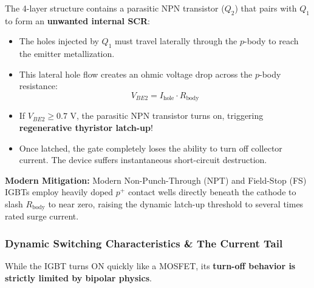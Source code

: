 \documentclass[11pt,a4paper]{article}
\begin{document}
\begin{alertbox}
The 4-layer structure contains a parasitic NPN transistor ($Q_2$) that pairs with $Q_1$ to form an \textbf{unwanted internal SCR}:
\begin{itemize}
  \item The holes injected by $Q_1$ must travel laterally through the $p$-body to reach the emitter metallization.
  \item This lateral hole flow creates an ohmic voltage drop across the $p$-body resistance:
  \begin{equation}
  V_{BE2} = I_{\text{hole}} \cdot R_{\text{body}}
  \end{equation}
  \item If $V_{BE2} \ge 0.7\text{ V}$, the parasitic NPN transistor turns on, triggering \textbf{regenerative thyristor latch-up}!
  \item Once latched, the gate completely loses the ability to turn off collector current. The device suffers instantaneous short-circuit destruction.
\end{itemize}
\textbf{Modern Mitigation:} Modern Non-Punch-Through (NPT) and Field-Stop (FS) IGBTs employ heavily doped $p^+$ contact wells directly beneath the cathode to slash $R_{\text{body}}$ to near zero, raising the dynamic latch-up threshold to several times rated surge current.
\end{alertbox}

\subsubsection{Dynamic Switching Characteristics \& The Current Tail}
While the IGBT turns ON quickly like a MOSFET, its \textbf{turn-off behavior is strictly limited by bipolar physics}.
\end{document}
